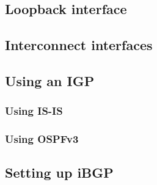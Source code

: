\subsection{Loopback interface}
\subsection{Interconnect interfaces}
\subsection{Using an IGP}
\subsubsection{Using IS-IS}
\subsubsection{Using OSPFv3}
\subsection{Setting up iBGP}
